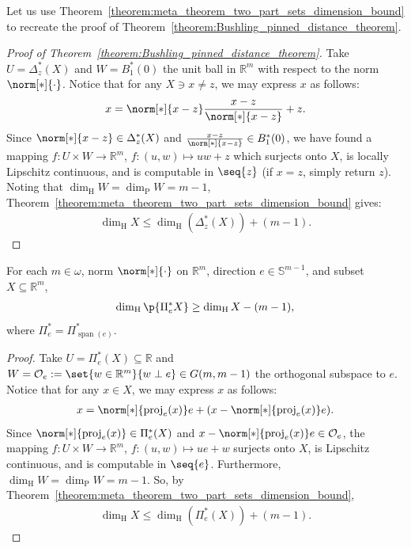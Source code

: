 Let us use Theorem~\ref{theorem:meta_theorem_two_part_sets_dimension_bound} to recreate the proof of Theorem~\ref{theorem:Bushling_pinned_distance_theorem}.

\begin{proof}[Proof of Theorem~\ref{theorem:Bushling_pinned_distance_theorem}]
    Take $U = \Delta^*_z(X)$ and $W = B^*_1(0)$ the unit ball in $\mathbb{R}^m$ with respect to the norm $\norm[*]{\cdot}$. Notice that for any $X \ni x \neq z$, we may express $x$ as follows:
    \begin{align*}
        x = \norm[*]{x - z} \frac{x - z}{\norm[*]{x - z}} + z.
    \end{align*}
    Since $\norm[*]{x - z} \in \Delta^*_z(X)$ and $\frac{x - z}{\norm[*]{x - z}} \in B^*_1(0)$, we have found a mapping $f : U \times W \to \mathbb{R}^m$, $f: (u, w) \mapsto u w + z$ which surjects onto $X$, is locally Lipschitz continuous, and is computable in $\seq{z}$ (if $x = z$, simply return $z$). Noting that $\dim_{\operatorname{H}} W = \dim_{\operatorname{P}} W = m - 1$, Theorem~\ref{theorem:meta_theorem_two_part_sets_dimension_bound} gives:
    \begin{align*}
        \dim_{\operatorname{H}} X \leq \dim_{\operatorname{H}}(\Delta^*_z(X)) + (m - 1).
    \end{align*}
\end{proof}

\begin{proposition}
    \label{proposition:Bushling_type_projection_theorem}
    For each $m \in \omega$, norm $\norm[*]{\cdot}$ on $\mathbb{R}^m$, direction $e \in \mathbb{S}^{m - 1}$, and subset $X \subseteq \mathbb{R}^m$,
    \begin{align*}
        \dim_{\operatorname{H}}\p{\Pi^*_e X} \geq \dim_{\operatorname{H}} X - (m - 1),
    \end{align*}
    where $\Pi^*_e = \Pi^*_{\operatorname{span}(e)}$.
\end{proposition}

\begin{proof}
    Take $U = \Pi^*_e(X) \subseteq \mathbb{R}$ and $W = \mathcal{O}_e := \set{w \in \mathbb{R}^m}{w \perp e} \in G(m, m - 1)$ the orthogonal subspace to $e$. Notice that for any $x \in X$, we may express $x$ as follows:
    \begin{align*}
        x = \norm[*]{\operatorname{proj}_e(x)} e + (x - \norm[*]{\operatorname{proj}_e(x)} e).
    \end{align*}
    Since $\norm[*]{\operatorname{proj}_e(x)} \in \Pi^*_e(X)$ and $x - \norm[*]{\operatorname{proj}_e(x)} e \in \mathcal{O}_e$, the mapping $f : U \times W \to \mathbb{R}^m$, $f : (u, w) \mapsto u e + w$ surjects onto $X$, is Lipschitz continuous, and is computable in $\seq{e}$. Furthermore, $\dim_{\operatorname{H}} W = \dim_{\operatorname{P}} W = m - 1$. So, by Theorem~\ref{theorem:meta_theorem_two_part_sets_dimension_bound},
    \begin{align*}
        \dim_{\operatorname{H}} X \leq \dim_{\operatorname{H}}(\Pi^*_e(X)) + (m - 1).
    \end{align*}
\end{proof}

